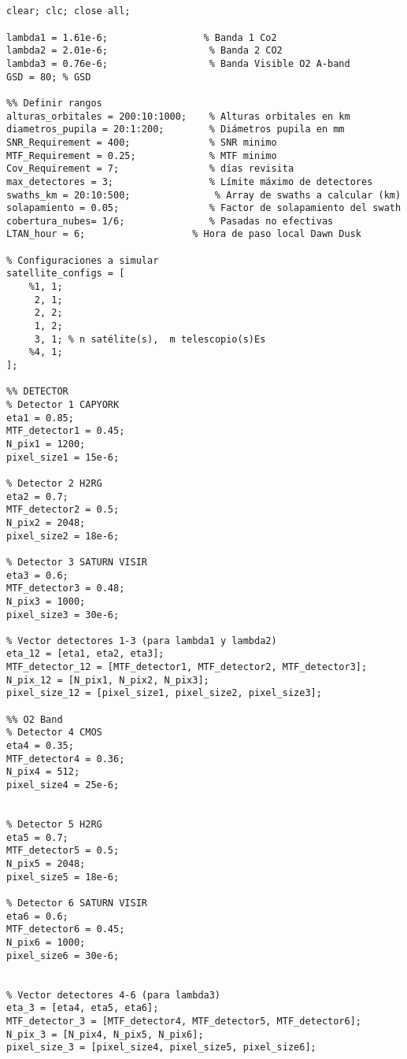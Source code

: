 \begin{verbatim}


clear; clc; close all;
                
lambda1 = 1.61e-6;                 % Banda 1 Co2
lambda2 = 2.01e-6;                  % Banda 2 CO2
lambda3 = 0.76e-6;                  % Banda Visible O2 A-band
GSD = 80; % GSD

%% Definir rangos
alturas_orbitales = 200:10:1000;    % Alturas orbitales en km
diametros_pupila = 20:1:200;        % Diámetros pupila en mm
SNR_Requirement = 400;              % SNR minimo
MTF_Requirement = 0.25;             % MTF minimo
Cov_Requirement = 7;                % días revisita
max_detectores = 3;                 % Límite máximo de detectores
swaths_km = 20:10:500;               % Array de swaths a calcular (km)                   
solapamiento = 0.05;                % Factor de solapamiento del swath
cobertura_nubes= 1/6;               % Pasadas no efectivas
LTAN_hour = 6;                   % Hora de paso local Dawn Dusk

% Configuraciones a simular
satellite_configs = [
    %1, 1;
     2, 1;
     2, 2;
     1, 2;
     3, 1; % n satélite(s),  m telescopio(s)Es
    %4, 1;
];

%% DETECTOR
% Detector 1 CAPYORK
eta1 = 0.85;
MTF_detector1 = 0.45;
N_pix1 = 1200;
pixel_size1 = 15e-6;

% Detector 2 H2RG
eta2 = 0.7;
MTF_detector2 = 0.5;
N_pix2 = 2048;
pixel_size2 = 18e-6;

% Detector 3 SATURN VISIR
eta3 = 0.6;
MTF_detector3 = 0.48;
N_pix3 = 1000;
pixel_size3 = 30e-6;

% Vector detectores 1-3 (para lambda1 y lambda2)
eta_12 = [eta1, eta2, eta3];
MTF_detector_12 = [MTF_detector1, MTF_detector2, MTF_detector3];
N_pix_12 = [N_pix1, N_pix2, N_pix3];
pixel_size_12 = [pixel_size1, pixel_size2, pixel_size3];

%% O2 Band
% Detector 4 CMOS
eta4 = 0.35;
MTF_detector4 = 0.36;
N_pix4 = 512;
pixel_size4 = 25e-6;


% Detector 5 H2RG
eta5 = 0.7;
MTF_detector5 = 0.5;
N_pix5 = 2048;
pixel_size5 = 18e-6;

% Detector 6 SATURN VISIR
eta6 = 0.6;
MTF_detector6 = 0.45;
N_pix6 = 1000;
pixel_size6 = 30e-6;


% Vector detectores 4-6 (para lambda3)
eta_3 = [eta4, eta5, eta6];
MTF_detector_3 = [MTF_detector4, MTF_detector5, MTF_detector6];
N_pix_3 = [N_pix4, N_pix5, N_pix6];
pixel_size_3 = [pixel_size4, pixel_size5, pixel_size6];


\end{verbatim}
